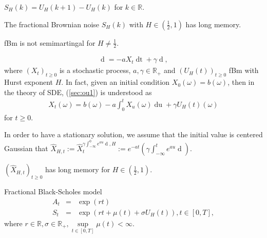 \documentclass[12pt]{beamer}
\newcommand{\brkt}[1]{\left({#1} \right)}
\begin{document}
\begin{frame}
  $S_H(k) = U_H(k+1) - U_H(k)$ for $k\in \mathbb{R}$.
  \begin{theorem}
	The fractional Brownian noise $S_H(k)$ with $H \in (\frac{1}{2}, 1)$ has long memory.
  \end{theorem}
\end{frame}
\begin{frame}
  fBm is not semimartingal for $H \neq\frac{1}{2}$.
\end{frame}


\begin{frame}
  \begin{eqnarray*}
 \mathop{dX_t} = -aX_t\mathop{dt} + \gamma \mathop{dU_H(t)},
 \label{sec:ou1}
\end{eqnarray*}
where $(X_t)_{t\ge 0}$ is a stochastic process, $a, \gamma\in\mathbb{R}_{+}$ and $(U_H(t))_{t\ge 0} $ fBm with Hurst exponent $H$. In fact, given an initial condition $X_0(\omega)=b(\omega)$, then in the theory of SDE, (\ref{sec:ou1}) is understood as
\begin{eqnarray*}
  X_t(\omega) = b(\omega) - a\int_0^t X_u(\omega) \mathop{du} + \gamma U_H(t)(\omega)
  \label{sec:oup}
\end{eqnarray*}
for $t \ge 0$.

In order to have a stationary solution, we assume that the initial value is centered Gaussian that $\hat{X}_{H,t}:= \hat{X}_t^{\gamma\int_{-\infty}^0 e^{au}\mathop{dU_H(u)}, H} := e^{-at}\brkt{\gamma\int_{-\infty}^t e^{au}\mathop{dU_H(u)}}$.
\end{frame}

\begin{frame}
  \begin{theorem}
	 $(\hat{X}_{H,t})_{t\ge 0}$ has long memory for $H\in (\frac{1}{2}, 1)$.
  \end{theorem}
\end{frame}

\begin{frame}
  Fractional Black-Scholes model
  \begin{eqnarray*}
  A_t &=& \exp(rt)\nonumber\\
  S_t &=& \exp(rt + \mu(t) +\sigma U_H(t)), t\in [0, T],
  \label{sec:fbs2}
\end{eqnarray*}
where  $r\in\mathbb{R}, \sigma\in\mathbb{R}_+, \sup\limits_{t\in[0, T]}\mu(t) < \infty$.
\end{frame}
\end{document}
